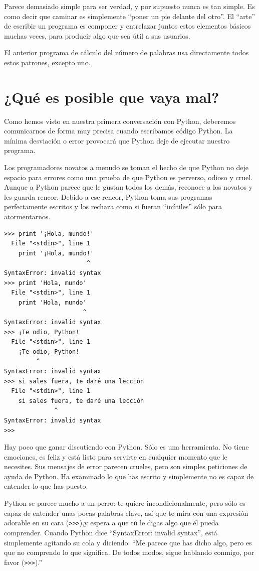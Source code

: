 Parece demasiado simple para ser verdad, y por supuesto nunca es tan simple.
Es como decir que caminar es simplemente
``poner un pie delante del otro''. El ``arte''
de escribir un programa es componer y entrelazar juntos estos
elementos básicos muchas veces, para producir algo
que sea útil a sus usuarios.

El anterior programa de cálculo del número de palabras usa directamente
todos estos patrones, excepto uno.

\section{¿Qué es posible que vaya mal?}

Como hemos visto en nuestra primera conversación con Python, deberemos
comunicarnos de forma muy precisa cuando escribamos código Python. La mínima
desviación o error provocará que Python deje de ejecutar
nuestro programa.

Los programadores novatos a menudo se toman el hecho de que Python no
deje espacio para errores como una prueba de que Python es perverso, odioso y cruel.
Aunque a Python parece que le gustan todos los demás, reconoce a los novatos
y les guarda rencor. Debido a ese rencor,
Python toma sus programas perfectamente escritos y los rechaza como si fueran
``inútiles'' sólo para atormentarnos.

\beforeverb
\begin{verbatim}
>>> primt '¡Hola, mundo!'
  File "<stdin>", line 1
    primt '¡Hola, mundo!'
                       ^
SyntaxError: invalid syntax
>>> primt 'Hola, mundo'
  File "<stdin>", line 1
    primt 'Hola, mundo'
                      ^
SyntaxError: invalid syntax
>>> ¡Te odio, Python!
  File "<stdin>", line 1
    ¡Te odio, Python!
         ^
SyntaxError: invalid syntax
>>> si sales fuera, te daré una lección
  File "<stdin>", line 1
    si sales fuera, te daré una lección
              ^
SyntaxError: invalid syntax
>>> 
\end{verbatim}
\afterverb
%
Hay poco que ganar discutiendo con Python. Sólo es una herramienta.
No tiene emociones, es feliz y está listo para servirte en cualquier momento
que le necesites. Sus mensajes de error parecen crueles, pero son simples
peticiones de ayuda de Python. Ha examinado lo que has escrito y simplemente
no es capaz de entender lo que has puesto.

Python se parece mucho a un perro: te quiere incondicionalmente, pero sólo es capaz
de entender unas pocas palabras clave, así que te mira con una expresión
adorable en su cara ({\tt >>>}),y espera a que tú le digas algo que él pueda comprender.
Cuando Python dice ``SyntaxError: invalid syntax'', está simplemente agitando
su cola y diciendo: ``Me parece que has dicho algo, pero es que no comprendo
lo que significa. De todos modos, sigue hablando conmigo, por favor ({\tt >>>}).''

